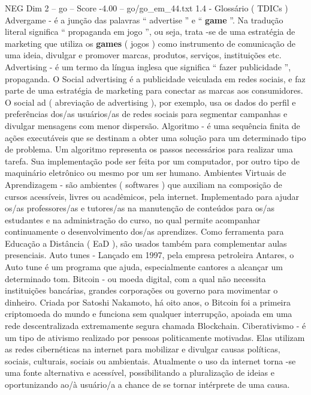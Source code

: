 \begin{textsample}{NEG Dim 2 – go – Score -4.00 – go/go\_em\_44.txt}  \label{ex:f2_neg_113}
1.4 - Glossário ( TDICs ) Advergame - é a junção das palavras “ advertise ” e “ \textbf{game} ”.
Na tradução literal significa “ propaganda em jogo ”, ou seja, trata -se de uma estratégia de marketing que utiliza os \textbf{games} ( jogos ) como instrumento de comunicação de uma ideia, divulgar e promover marcas, produtos, serviços, instituições etc.
Advertising - é um termo da língua inglesa que significa “ fazer publicidade ”, propaganda.
O Social advertising é a publicidade veiculada em redes sociais, e faz parte de uma estratégia de marketing para conectar as marcas aos consumidores.
O social ad ( abreviação de advertising ), por exemplo, usa os dados do perfil e preferências dos/as usuários/as de redes sociais para segmentar campanhas e divulgar mensagens com menor dispersão.
Algoritmo - é uma sequência finita de ações executáveis que se destinam a obter uma solução para um determinado tipo de problema.
Um algoritmo representa os passos necessários para realizar uma tarefa.
Sua implementação pode ser feita por um computador, por outro tipo de maquinário eletrônico ou mesmo por um ser humano.
Ambientes Virtuais de Aprendizagem - são ambientes ( softwares ) que auxiliam na composição de cursos acessíveis, livres ou acadêmicos, pela internet.
Implementado para ajudar os/as professores/as e tutores/as na manutenção de conteúdos para os/as estudantes e na administração do curso, no qual permite acompanhar continuamente o desenvolvimento dos/as aprendizes.
Como ferramenta para Educação a Distância ( EaD ), são usados também para complementar aulas presenciais.
Auto tunes - Lançado em 1997, pela empresa petroleira Antares, o Auto tune é um programa que ajuda, especialmente cantores a alcançar um determinado tom.
Bitcoin - ou moeda digital, com a qual não necessita instituições bancárias, grandes corporações ou governo para movimentar o dinheiro.
Criada por Satoshi Nakamoto, há oito anos, o Bitcoin foi a primeira criptomoeda do mundo e funciona sem qualquer interrupção, apoiada em uma rede descentralizada extremamente segura chamada Blockchain.
Ciberativismo - é um tipo de ativismo realizado por pessoas politicamente motivadas.
Elas utilizam as redes cibernéticas na internet para mobilizar e divulgar causas políticas, sociais, culturais, sociais ou ambientais.
Atualmente o uso da internet torna -se uma fonte alternativa e acessível, possibilitando a pluralização de ideias e oportunizando ao/à usuário/a a chance de se tornar intérprete de uma causa.

\end{textsample}

